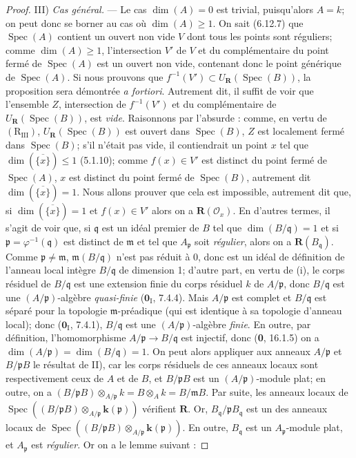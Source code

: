 \begin{proof}
III) \emph{Cas général.} --- Le cas $\dim(A)=0$ est trivial, puisqu'alors
$A=k$; on peut donc se borner au cas où $\dim(A)\geqslant1$. On sait
(6.12.7) que $\operatorname{Spec}(A)$ contient un ouvert non vide $V$ dont
tous les points sont réguliers; comme $\dim(A)\geqslant1$, l'intersection
$V'$ de $V$ et du complémentaire du point fermé de
$\operatorname{Spec}(A)$ est un ouvert non vide, contenant donc le point
générique de $\operatorname{Spec}(A)$. Si nous prouvons que
$f^{-1}(V')\subset U_{\mathbf R}(\operatorname{Spec}(B))$,
la proposition sera démontrée \emph{a fortiori}. Autrement dit, il suffit de
voir que l'ensemble $Z$, intersection de $f^{-1}(V')$ et du complémentaire
de $U_{\mathbf R}(\operatorname{Spec}(B))$, est \emph{vide}. Raisonnons par
l'absurde : comme, en vertu de $(\mathrm R_{\mathrm{III}})$,
$U_{\mathbf R}(\operatorname{Spec}(B))$ est ouvert dans
$\operatorname{Spec}(B)$, $Z$ est localement fermé dans
$\operatorname{Spec}(B)$; s'il n'était pas vide, il contiendrait un point
$x$ tel que $\dim(\overline{\{x\}})\leqslant1$ (5.1.10); comme
$f(x)\in V'$ est distinct du point fermé de $\operatorname{Spec}(A)$, $x$
est distinct du point fermé de $\operatorname{Spec}(B)$, autrement dit
$\dim(\overline{\{x\}})=1$. Nous allons prouver que cela est impossible,
autrement dit que, si $\dim(\overline{\{x\}})=1$ et $f(x)\in V'$ alors on a
$\boldsymbol R(\mathscr O_x)$. En d'autres termes, il s'agit de voir que,
si $\mathfrak q$ est un idéal premier de $B$ tel que
$\dim(B/\mathfrak q)=1$ et si $\mathfrak p=\varphi^{-1}(\mathfrak q)$ est
distinct de $\mathfrak m$ et tel que $A_{\mathfrak p}$ soit \emph{régulier}, alors
on a $\boldsymbol R(B_{\mathfrak q})$. Comme
$\mathfrak p\ne\mathfrak m$, $\mathfrak m(B/\mathfrak q)$ n'est pas réduit
à 0, donc est un idéal de définition de l'anneau local intègre
$B/\mathfrak q$ de dimension 1; d'autre part, en vertu de (i), le corps
résiduel de $B/\mathfrak q$ est une extension finie du corps résiduel $k$
de $A/\mathfrak p$, donc $B/\mathfrak q$ est une
$(A/\mathfrak p)$-algèbre \emph{quasi-finie} ($\mathbf{0}_{\mathrm I}$, 7.4.4). Mais
$A/\mathfrak p$ est complet et $B/\mathfrak q$ est séparé pour la topologie
$\mathfrak m$-préadique (qui est identique à sa topologie d'anneau local);
donc ($\mathbf{0}_{\mathrm I}$, 7.4.1), $B/\mathfrak q$ est une
$(A/\mathfrak p)$-algèbre \emph{finie}. En outre, par définition,
l'homomorphisme $A/\mathfrak p\to B/\mathfrak q$ est injectif, donc (\textbf{0},
16.1.5) on a
$\dim(A/\mathfrak p)=\dim(B/\mathfrak q)=1$.
On peut alors appliquer aux anneaux $A/\mathfrak p$ et
$B/\mathfrak pB$ le résultat de II), car les corps résiduels de ces anneaux
locaux sont respectivement ceux de $A$ et de $B$, et $B/\mathfrak pB$ est
un $(A/\mathfrak p)$-module plat; en outre, on a
$(B/\mathfrak pB)\otimes_{A/\mathfrak p}k=B\otimes_A k=B/\mathfrak mB$.
Par suite, les anneaux locaux de
$\operatorname{Spec}((B/\mathfrak pB)
\otimes_{A/\mathfrak p}\boldsymbol{k}(\mathfrak p))$
vérifient $\boldsymbol R$. Or, $B_{\mathfrak q}/\mathfrak pB_{\mathfrak q}$
est un des anneaux locaux de
$\operatorname{Spec}((B/\mathfrak pB)
\otimes_{A/\mathfrak p}\boldsymbol{k}(\mathfrak p))$. En outre,
$B_{\mathfrak q}$ est un $A_{\mathfrak p}$-module plat, et
$A_{\mathfrak p}$ est \emph{régulier}. Or on a le lemme suivant :


\end{proof}
